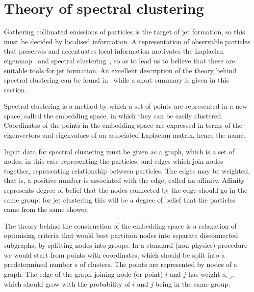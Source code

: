 \section{Theory of spectral clustering}\label{sec:spectral_theory}
Gathering collimated emissions of particles is the target of jet formation, so this must be decided by localised information.
A representation of observable particles that preserves and accentuates local information
motivates the Laplacian eigenmap~\cite{Belkin:2003_unfound4} and spectral
clustering~\cite{Ng:2001_unfound543}, so as to lead us to believe that these are suitable tools for jet formation.
An excellent description of the theory behind spectral clustering
can be found in~\cite{UlrikevonLuxburg:2007_unfound52} while a short
summary is given in this section.

Spectral clustering is a method by which a set of points are represented in a new space,
called the embedding space, in which they can be easily clustered.
Coordinates of the
points in the embedding space are expressed in terms of the eigenvectors and eigenvalues
of an associated Laplacian matrix, hence the name.

Input data for spectral clustering must be given as a graph,
which is a set of nodes, in this case representing the particles,
and edges which join nodes together, representing relationship between particles.
The edges may be weighted, that is, a positive number is associated with the edge,
called an affinity.
Affinity represents degree of belief that the nodes connected by the edge should go in the same group:
for jet clustering this will be a degree of belief that the particles came from the same shower.

The theory behind the
construction of the embedding space is a relaxation
of optimising criteria that would best 
partition nodes into separate disconnected subgraphs, by
splitting nodes into groups.
In a standard (non-physics) procedure we would start from points with coordinates,
which should be split into a predetermined number \(s\) of clusters.
The points are represented by nodes of a graph.
The edge of the graph joining node (or point) \(i\) and \(j\) has weight \(a_{i, j}\),
which should grow with the probability of \(i\) and \(j\) being in the same group.

